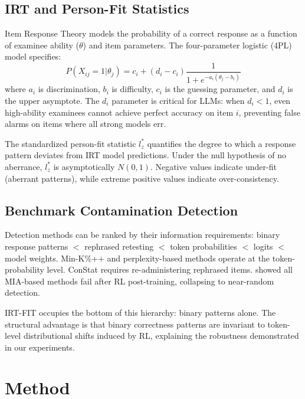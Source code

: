 \documentclass[11pt,a4paper]{article}
\newcommand{\lzstar}{$l_{z}^{*}$}
\begin{document}
\subsection{IRT and Person-Fit Statistics}

Item Response Theory models the probability of a correct response as a function of examinee ability ($\theta$) and item parameters.
The four-parameter logistic (4PL) model specifies:
\begin{equation}
P(X_{ij}=1 | \theta_j) = c_i + (d_i - c_i) \frac{1}{1 + e^{-a_i(\theta_j - b_i)}}
\label{eq:4pl}
\end{equation}
where $a_i$ is discrimination, $b_i$ is difficulty, $c_i$ is the guessing parameter, and $d_i$ is the upper asymptote.
The $d_i$ parameter is critical for LLMs: when $d_i < 1$, even high-ability examinees cannot achieve perfect accuracy on item $i$, preventing false alarms on items where all strong models err.

The standardized person-fit statistic \lzstar{} \citep{drasgow1985appropriateness} quantifies the degree to which a response pattern deviates from IRT model predictions.
Under the null hypothesis of no aberrance, \lzstar{} is asymptotically $N(0,1)$.
Negative values indicate under-fit (aberrant patterns), while extreme positive values indicate over-consistency.

\subsection{Benchmark Contamination Detection}

Detection methods can be ranked by their information requirements: binary response patterns $<$ rephrased retesting $<$ token probabilities $<$ logits $<$ model weights.
Min-K\%++ \citep{shi2024detecting} and perplexity-based methods operate at the token-probability level.
ConStat \citep{dekoninck2024constat} requires re-administering rephrased items.
\citet{wang2025rlcontam} showed all MIA-based methods fail after RL post-training, collapsing to near-random detection.

IRT-FIT occupies the bottom of this hierarchy: binary patterns alone.
The structural advantage is that binary correctness patterns are invariant to token-level distributional shifts induced by RL, explaining the robustness demonstrated in our experiments.

\section{Method}
\label{sec:method}
\end{document}

